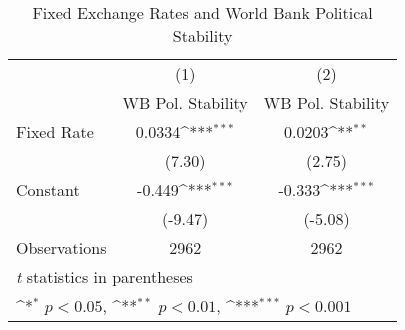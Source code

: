 \begin{table}[htbp]\centering
\def\sym#1{\ifmmode^{#1}\else\(^{#1}\)\fi}
\caption{Fixed Exchange Rates and World Bank Political Stability \label{WBratesalone}}
\begin{tabular}{l*{2}{c}}
\toprule
                                        &\multicolumn{1}{c}{(1)}&\multicolumn{1}{c}{(2)}\\
                                        &\multicolumn{1}{c}{WB Pol. Stability}&\multicolumn{1}{c}{WB Pol. Stability}\\
\midrule
Fixed Rate                              &   0.0334\sym{***}&   0.0203\sym{**} \\
                                        &   (7.30)         &   (2.75)         \\
\addlinespace
Constant                                &   -0.449\sym{***}&   -0.333\sym{***}\\
                                        &  (-9.47)         &  (-5.08)         \\
\midrule
Observations                            &     2962         &     2962         \\
\bottomrule
\multicolumn{3}{l}{\footnotesize \textit{t} statistics in parentheses}\\
\multicolumn{3}{l}{\footnotesize \sym{*} \(p<0.05\), \sym{**} \(p<0.01\), \sym{***} \(p<0.001\)}\\
\end{tabular}
\end{table}

